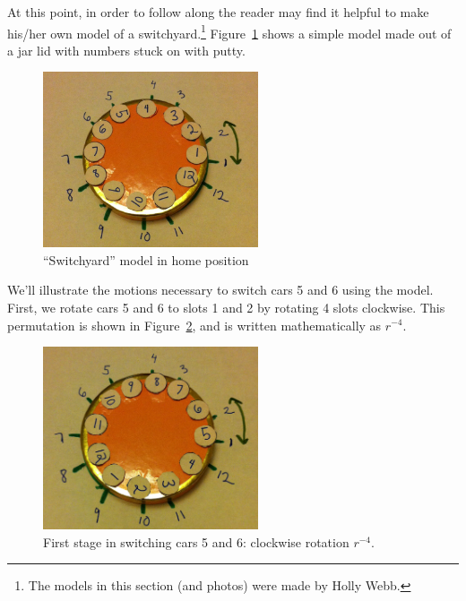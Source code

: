 At this point, in order to follow along the reader may find it helpful to make his/her own model of a switchyard.\footnote{The models in this section (and photos) were made by Holly Webb.} Figure~\ref{fig:switchyardHome} shows a simple model made out of a jar lid with numbers stuck on with putty.
\begin{figure}[ht]
\begin{center}
\includegraphics[width=2.5in]{images/switchyardHomeposition.jpg}
\caption{``Switchyard'' model in home position}\label{fig:switchyardHome}
\end{center}
\end{figure} 
We'll illustrate the motions necessary to switch cars  5 and 6  using the model.  First, we rotate cars 5 and 6 to slots 1 and 2 by rotating 4 slots clockwise. This permutation is shown in Figure~\ref{fig:switchyardCl4}, and is written mathematically as $r^{-4}$.
\begin{figure}[ht]
\begin{center}
\includegraphics[width=2.5in]{images/switchyardCl4.jpg}
\caption{First stage in switching cars 5 and 6: clockwise rotation $r^{-4}$.}\label{fig:switchyardCl4}
\end{center}
\end{figure} 

